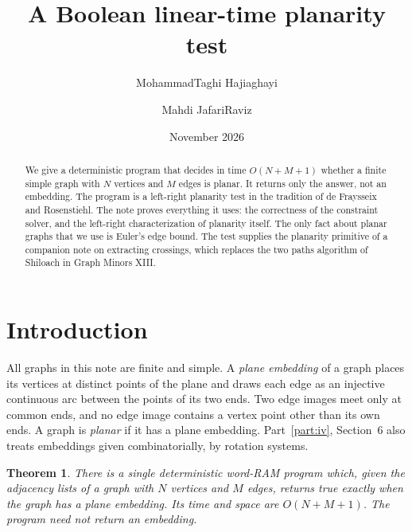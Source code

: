 \documentclass[11pt]{article}
\title{\textbf{A Boolean linear-time planarity test}}
\author{MohammadTaghi Hajiaghayi \and Mahdi JafariRaviz}
\date{November 2026}
\newtheorem*{theorem}{Theorem}
\begin{document}
\maketitle

\begin{abstract}
We give a deterministic program that decides in time $O(N+M+1)$ whether a
finite simple graph with $N$ vertices and $M$ edges is planar. It returns only
the answer, not an embedding. The program is a left-right planarity test in the
tradition of de Fraysseix and Rosenstiehl. The note proves everything it uses:
the correctness of the constraint solver, and the left-right characterization
of planarity itself. The only fact about planar graphs that we use is Euler's
edge bound. The test supplies the planarity primitive of a companion note on
extracting crossings, which replaces the two paths algorithm of Shiloach in
Graph Minors XIII.
\end{abstract}

\section*{Introduction}

All graphs in this note are finite and simple. A \emph{plane embedding} of a
graph places its vertices at distinct points of the plane and draws each edge
as an injective continuous arc between the points of its two ends. Two edge
images meet only at common ends, and no edge image contains a vertex point
other than its own ends. A graph is \emph{planar} if it has a plane embedding.
Part~\ref{part:iv}, Section~6 also treats embeddings given combinatorially, by
rotation systems.

\begin{theorem}
There is a single deterministic word-RAM program which, given the adjacency
lists of a graph with $N$ vertices and $M$ edges, returns true exactly when the
graph has a plane embedding. Its time and space are $O(N+M+1)$. The program
need not return an embedding.
\end{theorem}
\end{document}
